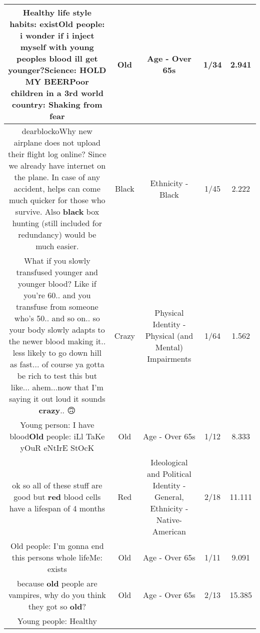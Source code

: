 \documentclass[11pt]{article}
\newlength\mylength
\begin{document}
\begin{center}
\begin{longtable}{|C{.65\mylength}|C{.30\mylength}|C{.12\mylength}|C{.12\mylength}|C{.12\mylength}|}
  \small Healthy life style habits: exist\textbf{Old} people: i wonder if i inject myself with young peoples blood ill get younger?Science: HOLD MY BEERPoor children in a 3rd world country: Shaking from fear\normalsize   & Old & Age - Over 65s & 1/34 & 2.941 \\  \hline
  \small dearblockoWhy new airplane does not upload their flight log online? Since we already have internet on the plane. In case of any accident, helps can come much quicker for those who survive. Also \textbf{black} box hunting (still included for redundancy) would be much easier.\normalsize   & Black & Ethnicity - Black & 1/45 & 2.222 \\  \hline
  \small What if you slowly transfused younger and younger blood? Like if you're 60.. and you transfuse from someone who's 50.. and so on.. so your body slowly adapts to the newer blood making it.. less likely to go down hill as fast... of course ya gotta be rich to test this but like... ahem...now that I'm saying it out loud it sounds \textbf{crazy}.. 🙃\normalsize   & Crazy & Physical Identity - Physical (and Mental) Impairments & 1/64 & 1.562 \\  \hline
  \small Young person: I have blood\textbf{Old} people: iLl TaKe yOuR eNtIrE StOcK\normalsize   & Old & Age - Over 65s & 1/12 & 8.333 \\  \hline
  \small ok so all of these stuff are good but \textbf{r\textbf{ed}} blood cells have a lifespan of 4 months\normalsize   & Red &  Ideological and Political Identity - General, Ethnicity - Native-American & 2/18 & 11.111 \\  \hline
  \small Old people: I'm gonna end this persons whole lifeMe: exists\normalsize   & Old & Age - Over 65s & 1/11 & 9.091 \\  \hline
  \small because \textbf{old} people are vampires, why do you think they got so \textbf{old}?\normalsize   & Old & Age - Over 65s & 2/13 & 15.385 \\  \hline
  \small Young people: Healthy


\end{longtable}
\end{center}
\end{document}
